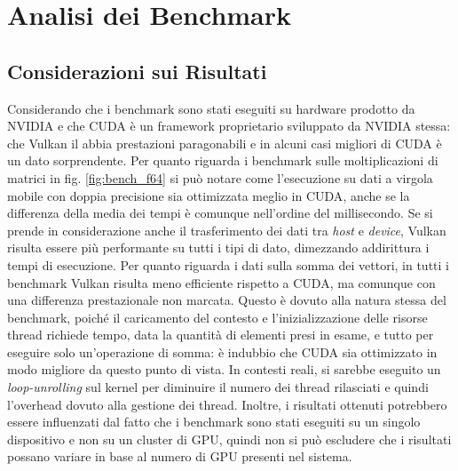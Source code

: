 \chapter{Analisi dei Benchmark}
\label{sec:analisys}

\section{Considerazioni sui Risultati}


Considerando che i benchmark sono stati eseguiti su hardware prodotto da NVIDIA e che \gls{CUDA} è un framework proprietario sviluppato da NVIDIA stessa: che Vulkan il abbia prestazioni paragonabili e in alcuni casi migliori di \gls{CUDA} è un dato sorprendente. Per quanto riguarda i benchmark sulle moltiplicazioni di matrici in fig. \ref{fig:bench_f64} si può notare come l'esecuzione su dati a virgola mobile con doppia precisione sia ottimizzata meglio in \gls{CUDA}, anche se la differenza della media dei tempi è comunque nell'ordine del millisecondo. Se si prende in considerazione anche il trasferimento dei dati tra \textit{host} e \textit{device}, Vulkan risulta essere più performante su tutti i tipi di dato, dimezzando addirittura i tempi di esecuzione. Per quanto riguarda i dati sulla somma dei vettori, in tutti i benchmark Vulkan risulta meno efficiente rispetto a \gls{CUDA}, ma comunque con una differenza prestazionale non marcata. Questo è dovuto alla natura stessa del benchmark, poiché il caricamento del contesto e l'inizializzazione delle risorse thread richiede tempo, data la quantità di elementi presi in esame, e tutto per eseguire solo un'operazione di somma: è indubbio che \gls{CUDA} sia ottimizzato in modo migliore da questo punto di vista. In contesti reali, si sarebbe eseguito un \textit{loop-unrolling} sul kernel per diminuire il numero dei thread rilasciati e quindi l'overhead dovuto alla gestione dei thread. Inoltre, i risultati ottenuti potrebbero essere influenzati dal fatto che i benchmark sono stati eseguiti su un singolo dispositivo e non su un cluster di \gls{GPU}, quindi non si può escludere che i risultati possano variare in base al numero di \gls{GPU} presenti nel sistema.


